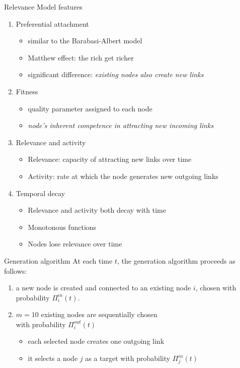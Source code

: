 \documentclass[utf8]{beamer}
\begin{document}
\begin{frame}{Relevance Model features}
    \begin{enumerate}
        \item \alert{Preferential attachment}
        \begin{itemize}
            \item similar to the Barabasi-Albert model
            \item Matthew effect: the rich get richer
            \item significant difference: \emph{existing nodes also create new links}
        \end{itemize}

        \item \alert{Fitness}
        \begin{itemize}
            \item quality parameter assigned to each node
            \item \emph{node’s inherent competence in attracting new incoming links}
        \end{itemize}

        \item \alert{Relevance and activity}
        \begin{itemize}
            \item Relevance: capacity of attracting new links over time
            \item Activity: rate at which the node generates new outgoing links
        \end{itemize}

        \item \alert{Temporal decay}
        \begin{itemize}
            \item Relevance and activity both decay with time
            \item Monotonous functions
            \item Nodes lose relevance over time
        \end{itemize}
    \end{enumerate}
\end{frame}

\begin{frame}{Generation algorithm}
    At each time $t$, the generation algorithm proceeds as follows:
    \begin{enumerate}
        \item a new node is created and connected to an existing node $i$, chosen with probability $\Pi_i^{in}(t)$.
        \item $m=10$ existing nodes are sequentially chosen \\ with probability $\Pi_i^{out}(t)$
        \begin{itemize}
            \item each selected node creates one outgoing link
            \item it selects a node $j$ as a target with probability $\Pi_j^{in}(t)$
        \end{itemize}
    \end{enumerate}
\end{frame}
\end{document}
